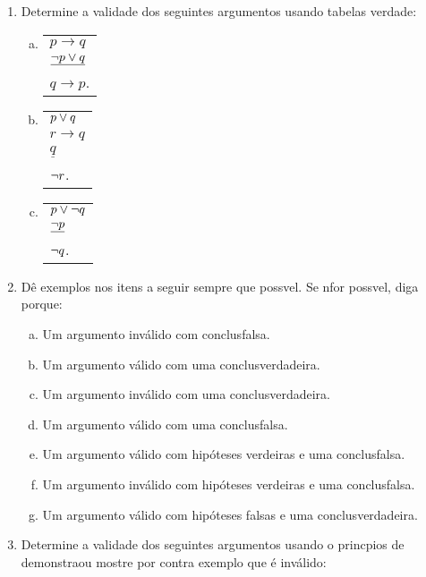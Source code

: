\begin{enumerate}[{\bf 1.}]
\item Determine a validade dos seguintes argumentos usando tabelas verdade:
\begin{multicols}{3}
\begin{enumerate}[a)]
\item \begin{tabular}{l}
$p\to q$ \\
$\underline{\lnot p\vee q}$ \\
$q\to p$.
\end{tabular}

\item \begin{tabular}{l}
$p\vee q$ \\
$r \to q$ \\
$\underline{q}$ \\
$\lnot r$.
\end{tabular}

\item \begin{tabular}{l}
$p\vee \lnot q$ \\
$\underline{\lnot p}$ \\
$\lnot q$.
\end{tabular}
\end{enumerate}
\end{multicols}

\item D\^e exemplos nos itens a seguir sempre que poss\ih vel. Se n\ao for poss\ih vel, diga porque:
\begin{enumerate}[a)]
\item Um argumento inv\'alido com conclus\ao falsa.
\item Um argumento v\'alido com uma conclus\ao verdadeira. 
\item Um argumento inv\'alido com uma conclus\ao verdadeira.
\item Um argumento v\'alido com uma conclus\ao falsa.
\item Um argumento v\'alido com hip\'oteses verdeiras e uma conclus\ao falsa.
\item Um argumento inv\'alido com hip\'oteses verdeiras e uma conclus\ao falsa.
\item Um argumento v\'alido com hip\'oteses falsas e uma conclus\ao verdadeira.
\end{enumerate}

\item Determine a validade dos seguintes argumentos usando o princ\ih pios de demonstra\cao ou mostre por contra exemplo que \'e inv\'alido:


\end{enumerate}
